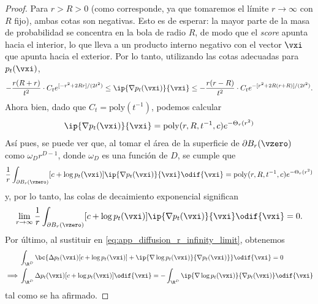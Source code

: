 \documentclass[../../book-main_es.tex]{subfiles}
\begin{document}
\begin{proof}
    Para \(r > R > 0\) (como corresponde, ya que tomaremos
    el límite \(r \to \infty\) con \(R\) fijo), ambas cotas son
    negativas. Esto es de esperar: la mayor parte de la masa de probabilidad se
    concentra en la bola de radio \(R\), de modo que el \textit{score}
    apunta hacia el interior, lo que lleva a un producto interno negativo con el
    vector \(\vxi\) que apunta hacia el exterior. Por lo tanto, utilizando las cotas adecuadas
    para \(p_{t}(\vxi)\),
    \begin{equation}
        -\frac{r(R + r)}{t^{2}}\cdot C_{t}e^{[-r^{2} + 2Rr]/(2t^{2})}
        \leq \ip{\nabla p_{t}(\vxi)}{\vxi} \leq -\frac{r(r -
        R)}{t^{2}}\cdot C_{t}e^{-[r^{2} + 2R(r + R)]/(2t^{2})}.
    \end{equation}
    Ahora bien, dado que \(C_{t} = \mathrm{poly}(t^{-1})\), podemos calcular
    \begin{equation}
        [c + \log p_{t}(\vxi)]\ip{\nabla p_{t}(\vxi)}{\vxi} =
        \mathrm{poly}(r, R, t^{-1}, c)e^{-\Theta_{r}(r^{2})}
    \end{equation}
    Así pues, se puede ver que, al tomar el área de la superficie de \(\partial
    B_{r}(\vzero)\) como \(\omega_{D} r^{D - 1}\), donde \(\omega_{D}\)
    es una función de \(D\), se cumple que
    \begin{equation}
        \frac{1}{r}\int_{\partial B_{r}(\vzero)}[c + \log
        p_{t}(\vxi)]\ip{\nabla p_{t}(\vxi)}{\vxi}\odif{\vxi} =
        \mathrm{poly}(r, R, t^{-1}, c)e^{-\Theta_{r}(r^{2})}
    \end{equation}
    y, por lo tanto, las colas de decaimiento exponencial significan
    \begin{equation}
        \lim_{r \to \infty}\frac{1}{r}\int_{\partial B_{r}(\vzero)}[c
        + \log p_{t}(\vxi)]\ip{\nabla p_{t}(\vxi)}{\vxi}\odif{\vxi} = 0.
    \end{equation}
    Por último, al sustituir en \eqref{eq:app_diffusion_r_infinity_limit}, obtenemos
    \begin{align}
        &\int_{\R^{D}}\bc{\Delta p_{t}(\vxi)[c + \log p_{t}(\vxi)] +
        \ip{\nabla \log p_{t}(\vxi)}{\nabla p_{t}(\vxi)}}\odif{\vxi} = 0 \\
        \implies
        &\int_{\R^{D}}\Delta p_{t}(\vxi)[c + \log
        p_{t}(\vxi)]\odif{\vxi} = -\int_{\R^{D}}\ip{\nabla \log
        p_{t}(\vxi)}{\nabla p_{t}(\vxi)}\odif{\vxi}
    \end{align}
    tal como se ha afirmado.
\end{proof}
\end{document}
